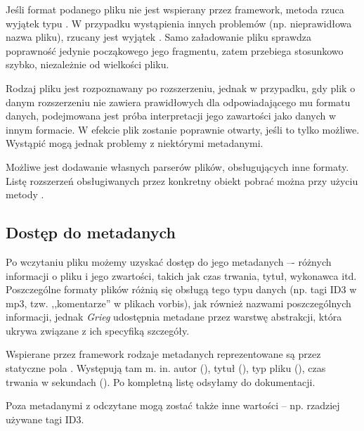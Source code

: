 Jeśli format podanego pliku nie jest wspierany przez framework, metoda  rzuca wyjątek
typu . W przypadku wystąpienia innych problemów (np.  nieprawidłowa
nazwa pliku), rzucany jest wyjątek . Samo załadowanie pliku sprawdza poprawność
jedynie począkowego jego fragmentu, zatem przebiega stosunkowo szybko, niezależnie od wielkości
pliku.

\begin{Tip}
Rodzaj pliku jest rozpoznawany po rozszerzeniu, jednak w przypadku, gdy plik o danym rozszerzeniu
nie zawiera prawidłowych dla odpowiadającego mu formatu danych, podejmowana jest próba interpretacji
jego zawartości jako danych w innym formacie. W efekcie plik zostanie poprawnie otwarty, jeśli to
tylko możliwe. Wystąpić mogą jednak problemy z niektórymi metadanymi.
\end{Tip}

\begin{Note}
Możliwe jest dodawanie własnych parserów plików, obsługujących inne formaty. Listę rozszerzeń
obsługiwanych przez konkretny obiekt  pobrać można przy użyciu metody
.
\end{Note}


\subsection{Dostęp do metadanych}

Po wczytaniu pliku możemy uzyskać dostęp do jego metadanych –- różnych informacji o pliku i jego
zwartości, takich jak czas trwania, tytuł, wykonawca itd. Poszczególne formaty plików różnią się
obsługą tego typu danych (np. tagi ID3 w mp3, tzw. ,,komentarze'' w plikach vorbis), jak również
nazwami poszczególnych informacji, jednak \emph{Grieg} udostępnia metadane przez warstwę abstrakcji,
która ukrywa związane z ich specyfiką szczegóły.

Wspierane przez framework rodzaje metadanych reprezentowane są przez statyczne pola
. Występują tam m. in. autor (), tytuł (), typ pliku
(), czas trwania w sekundach (). Po kompletną listę odsyłamy do
dokumentacji.

\begin{Note}
Poza metadanymi z  odczytane mogą zostać także inne wartości -- np. rzadziej
używane tagi ID3.
\end{Note}

